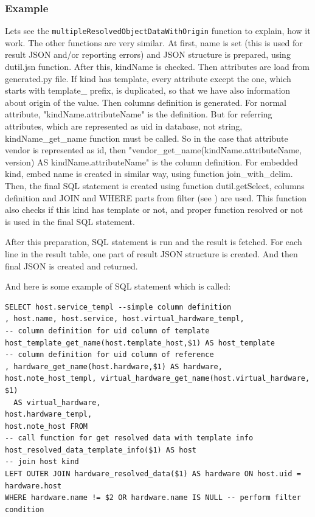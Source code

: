 \documentclass[deska]{subfiles}
\begin{document}
\subsubsection{Example}
Lets see the {\tt multipleResolvedObjectDataWithOrigin} function to explain, how it work. The other functions are very similar.
At first, name is set (this is used for result JSON and/or reporting errors) and JSON structure is prepared,
using dutil.jsn function. After this, kindName is checked. Then attributes are load from generated.py file.
If kind has template, every attribute except the one, which starts with template\_ prefix, is duplicated, so that we have
also information about origin of the value.
Then columns definition is generated. For normal attribute, "kindName.attributeName" is the definition.
But for referring attributes, which are
represented as uid in database, not string, kindName\_get\_name function must be called. So in the case that attribute vendor is represented as id, then
"vendor\_get\_name(kindName.attributeName, version) AS kindName.attributeName" is the column definition. For embedded kind, embed name is created in similar way,
using function join\_with\_delim.
Then, the final SQL statement is created using function dutil.getSelect, columns definition and JOIN and WHERE parts from filter (see ) are used.
This function also checks if this kind has template or not, and proper function resolved or not is used in the final SQL statement.

After this preparation, SQL statement is run and the result is fetched. For each line in the result table, one part of result JSON structure is
created. And then final JSON is created and returned.

And here is some example of SQL statement which is called:
\begin{verbatim}
SELECT host.service_templ --simple column definition
, host.name, host.service, host.virtual_hardware_templ,
-- column definition for uid column of template
host_template_get_name(host.template_host,$1) AS host_template
-- column definition for uid column of reference
, hardware_get_name(host.hardware,$1) AS hardware,
host.note_host_templ, virtual_hardware_get_name(host.virtual_hardware, $1)
  AS virtual_hardware,
host.hardware_templ,
host.note_host FROM
-- call function for get resolved data with template info
host_resolved_data_template_info($1) AS host
-- join host kind
LEFT OUTER JOIN hardware_resolved_data($1) AS hardware ON host.uid = hardware.host
WHERE hardware.name != $2 OR hardware.name IS NULL -- perform filter condition
\end{verbatim}
\end{document}

